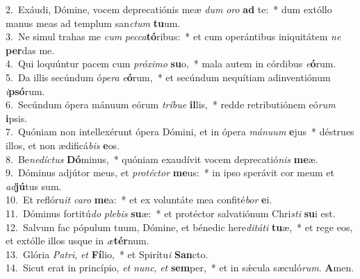 {2.~}Exáudi, Dómine, vocem deprecatiónis meæ \textit{dum} \textit{o}\textit{ro} \textbf{ad} te:~* dum extóllo manus meas ad templum san\textit{ctum} \textbf{tu}um.\\
{3.~}Ne simul trahas me \textit{cum} \textit{pec}\textit{ca}\textbf{tó}ribus:~* et cum operántibus iniquitátem \textit{ne} \textbf{per}das me.\\
{4.~}Qui loquúntur pacem cum \textit{pró}\textit{xi}\textit{mo} \textbf{su}o,~* mala autem in córdibus \textit{e}\textbf{ó}rum.\\
{5.~}Da illis secúndum ó\textit{pe}\textit{ra} \textit{e}\textbf{ó}rum,~* et secúndum nequítiam adinventiónum \textit{i}\textbf{psó}rum.\\
{6.~}Secúndum ópera mánuum eórum \textit{trí}\textit{bu}\textit{e} \textbf{il}lis,~* redde retributiónem eó\textit{rum} \textbf{i}psis.\\
{7.~}Quóniam non intellexérunt ópera Dómini, et in ópera \textit{má}\textit{nu}\textit{um} \textbf{e}jus~* déstrues illos, et non ædificá\textit{bis} \textbf{e}os.\\
{8.~}Be\textit{ne}\textit{dí}\textit{ctus} \textbf{Dó}minus,~* quóniam exaudívit vocem deprecatió\textit{nis} \textbf{me}æ.\\
{9.~}Dóminus adjútor meus, et \textit{pro}\textit{té}\textit{ctor} \textbf{me}us:~* in ipso sperávit cor meum et \textit{ad}\textbf{jú}tus sum.\\
{10.~}Et reflóru\textit{it} \textit{ca}\textit{ro} \textbf{me}a:~* et ex voluntáte mea confité\textit{bor} \textbf{e}i.\\
{11.~}Dóminus fortitú\textit{do} \textit{ple}\textit{bis} \textbf{su}æ:~* et protéctor salvatiónum Chri\textit{sti} \textbf{su}i est.\\
{12.~}Salvum fac pópulum tuum, Dómine, et bénedic here\textit{di}\textit{tá}\textit{ti} \textbf{tu}æ,~* et rege eos, et extólle illos usque in \textit{æ}\textbf{tér}num.\\
{13.~}Glória \textit{Pa}\textit{tri}, \textit{et} \textbf{Fí}lio,~* et Spirítu\textit{i} \textbf{San}cto.\\
{14.~}Sicut erat in princípio, \textit{et} \textit{nunc}, \textit{et} \textbf{sem}per,~* et in sǽcula sæculó\textit{rum}. \textbf{A}men.\\
